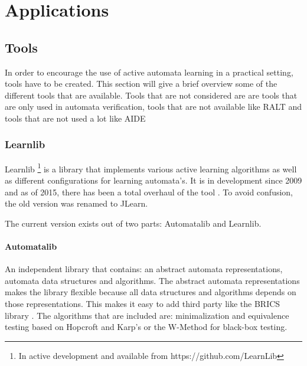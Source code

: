 \documentclass[multi,crop=false,class=article]{standalone}
\begin{document}
\section{Applications}
\label{sec:applications}

\subsection{Tools}

In order to encourage the use of active automata learning in a practical 
setting, tools have to be created. This section will give a brief overview some 
of the different tools that are available. Tools that are not considered are
are tools that are only used in automata verification, tools that are not 
available like RALT \cite{Shahbaz:2014:ATB:2858086.2858089} and tools that are 
not used a lot like AIDE \cite{Cicala2016} 

\subsubsection{Learnlib}

Learnlib  \footnote{In active development and available from 
https://github.com/LearnLib } is a library that implements various active 
learning algorithms as well as different configurations for learning 
automata's. It is in development since 2009 \cite{Raffelt2009} and as of 2015, 
there has been a 
total overhaul of the tool \cite{Isberner2015}. To avoid confusion, the old 
version was renamed 
to JLearn. 

The current version exists out of two parts: Automatalib and Learnlib.


\paragraph{Automatalib} An independent library that contains: an abstract 
automata representations, automata data structures and algorithms. The abstract 
automata representations makes the library flexible because all data structures
and algorithms depends on those representations. This makes it easy to add 
third party like the BRICS library \cite{Alur:2005:SIS:1047659.1040314}. The 
algorithms that are included are: minimalization and equivalence testing based 
on Hopcroft and Karp's \cite{hopcroft1971linear} or the W-Method for black-box 
testing. 
\end{document}
